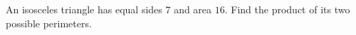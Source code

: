 An isosceles triangle has equal sides $7$ and area $16$. Find the product of its two possible perimeters.
